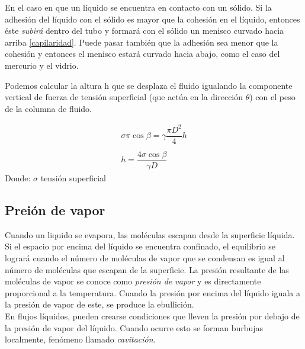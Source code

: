 En el caso en que un líquido se encuentra en contacto con un sólido. Si la adhesión del líquido con el sólido es mayor que la cohesión en el líquido, entonces éste \emph{subirá} dentro del tubo y formará con el sólido un menisco curvado hacia arriba \ref{capilaridad}. Puede pasar también que la adhesión sea menor que la cohesión y entonces el menisco estará curvado hacia abajo, como el caso del mercurio y el vidrio.

Podemos calcular la altura h que se desplaza el fluido igualando la componente vertical de fuerza de tensión superficial (que actúa en la dirección $\theta$) con el peso de la columna de fluido.

\begin{gather*}
	\sigma \pi \cos \beta = \gamma \dfrac{\pi D^2}{4} h \\
	\\
	h = \dfrac{4 \sigma \cos \beta}{\gamma D}
\end{gather*}
Donde:
	$\sigma$ tensión superficial

\subsection{Preión de vapor}
Cuando un liquido se evapora, las moléculas escapan desde la superficie líquida.  Si el espacio por encima del líquido se encuentra confinado, el equilibrio se logrará cuando el número de moléculas de vapor que se condensan es igual al número de moléculas que escapan de la superficie. La presión resultante de las moléculas de vapor se conoce como \emph{presión de vapor} y es directamente proporcional a la temperatura. Cuando la presión por encima del líquido iguala a la presión de vapor de este, se produce la ebullición. \\

En flujos líquidos, pueden crearse condiciones que lleven la presión por debajo de la presión de vapor del líquido. Cuando ocurre esto se forman burbujas localmente, fenómeno llamado \emph{cavitación}.



